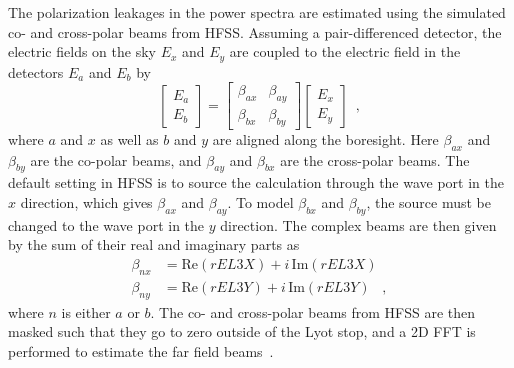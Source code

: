 The polarization leakages in the power spectra are estimated using the simulated co- and cross-polar beams from HFSS. Assuming a pair-differenced detector, the electric fields on the sky $E_x$ and $E_y$ are coupled to the electric field in the detectors $E_a$ and $E_b$ by
\begin{equation}\label{eqn:beams}
  \begin{bmatrix}
  E_a\\
  E_b
  \end{bmatrix}
  =
  \begin{bmatrix}
  \beta_{ax} & \beta_{ay}\\
  \beta_{bx} & \beta_{by}
  \end{bmatrix}
  \begin{bmatrix}
  E_x\\
  E_y
  \end{bmatrix}
  \,\,\, ,
\end{equation}
where $a$ and $x$ as well as $b$ and $y$ are aligned along the boresight. Here $\beta_{ax}$ and $\beta_{by}$ are the co-polar beams, and $\beta_{ay}$ and $\beta_{bx}$ are the cross-polar beams. The default setting in HFSS is to source the calculation through the wave port in the $x$ direction, which gives $\beta_{ax}$ and $\beta_{ay}$. To model $\beta_{bx}$ and $\beta_{by}$, the source must be changed to the wave port in the $y$ direction. The complex beams are then given by the sum of their real and imaginary parts as
\begin{align}
\beta_{nx} & =  \mathrm{Re}(rEL3X)+i\, \mathrm{Im}(rEL3X) \nonumber \\
\beta_{ny} & =  \mathrm{Re}(rEL3Y)+i\, \mathrm{Im}(rEL3Y)\,\,\,\,\,,
\end{align}
where $n$ is either $a$ or $b$. The co- and cross-polar beams from HFSS are then masked such that they go to zero outside of the Lyot stop, and a 2D FFT is performed to estimate the far field beams~\cite{Simon_Thesis_2016}.

